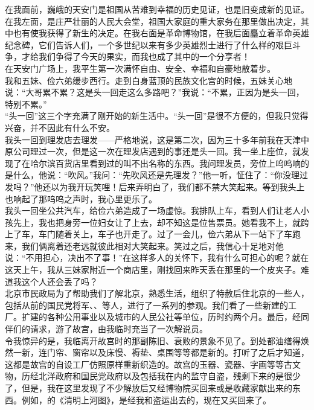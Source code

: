 在我面前，巍峨的天安门是祖国从苦难到幸福的历史见证，也是旧变成新的见证。在我左面，是庄严壮丽的人民大会堂，祖国大家庭的重大家务在那里做出决定，其中也有使我获得了新生的决定。在我右面是革命博物馆，在我后面矗立着革命英雄纪念碑，它们告诉人们，一个多世纪以来有多少英雄烈士进行了什么样的艰巨斗争，才给我们争得了今天的果实，而我也成了其中的一个分享者！\\

在天安门广场上，我平生第一次满怀自由、安全、幸福和自豪地散着步。\\

我和五妹、俭六弟缓步西行。走到白身蓝顶的民族文化宫的时候，五妹关心地说：“大哥累不累？这是头一回走这么多路吧？”我说：“不累，正因为是头一回，特别不累。”\\

“头一回”这三个字充满了刚开始的新生活中。“头一回”是很不方便的，但我只觉得兴奋，并不因此有什么不安。\\

我头一回到理发店去理发——严格地说，这是第二次，因为三十多年前我在天津中原公司理过一次，但是这一次在理发店遇到的事还是头一回。我一坐上座位，就发现了在哈尔滨百货店里看到过的叫不出名称的东西。我问理发员，旁位上呜呜响的是什么，他说：“吹风。”我问：“先吹风还是先理发？”他一听，怔住了：“你没理过发吗？”他还以为我开玩笑哩！后来弄明白了，我们都不禁大笑起来。等到我头上也响起了那呜呜之声时，我心里更乐了。\\

我头一回坐公共汽车，给俭六弟造成了一场虚惊。我排队上车，看到人们让老人小孩先上，我也把身旁一位妇女让了上去，却不知这是位售票员。她看我不上，就跨上了车，车门随着关上，车子也开走了。过了一会儿，俭六弟从下一站下了车跑来，我们俩离着还老远就彼此相对大笑起来。笑过之后，我信心十足地对他说：“不用担心，决出不了事！”在这样多人的关怀下，我有什么可担心的呢？就在这天上午，我从三妹家附近一个商店里，刚找回来昨天丢在那里的一个皮夹子。难道我这个人还会丢了吗？\\

北京市民政局为了帮助我们了解北京，熟悉生活，组织了特赦后住北京的一些人，包括从前的国民党将军、、等人，进行了一系列的参观。我们看了一些新建的工厂。扩建的各种公用事业以及城市的人民公社等单位，历时约两个月。最后，经同伴们的请求，游了故宫，由我临时充当了一次解说员。\\

令我惊异的是，我临离开故宫时的那副陈旧、衰败的景象不见了。到处都油缮得焕然一新，连门帘、窗帘以及床慢、褥垫、桌围等等都是新的。打听了之后才知道，这都是故宫的自设工厂仿照原样重新织造的。故宫的玉器、瓷器、字画等等古文物，历经北洋政府和国民党政府以及包括我在内的监守自盗，残剩下来的是很少了，但是，我在这里发现了不少解放后又经博物院买回来或是收藏家献出来的东西。例如，的《清明上河图》，是经我和盗运出去的，现在又买回来了。\\

